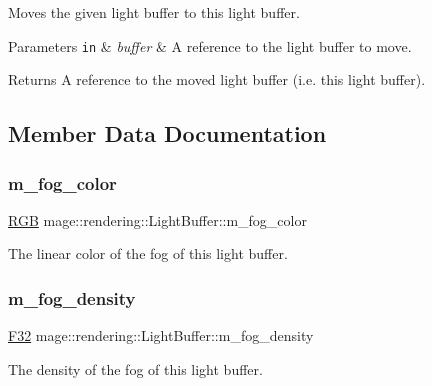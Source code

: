 Moves the given light buffer to this light buffer.


\begin{DoxyParams}[1]{Parameters}
\mbox{\tt in}  & {\em buffer} & A reference to the light buffer to move. \\
\hline
\end{DoxyParams}
\begin{DoxyReturn}{Returns}
A reference to the moved light buffer (i.\+e. this light buffer). 
\end{DoxyReturn}


\subsection{Member Data Documentation}
\hypertarget{structmage_1_1rendering_1_1_light_buffer_afe8a6982304bb5b6ee89f533798c569d}{}\label{structmage_1_1rendering_1_1_light_buffer_afe8a6982304bb5b6ee89f533798c569d} 
\subsubsection{\texorpdfstring{m\+\_\+fog\+\_\+color}{m\_fog\_color}}
{\footnotesize\ttfamily \hyperlink{structmage_1_1_r_g_b}{R\+GB} mage\+::rendering\+::\+Light\+Buffer\+::m\+\_\+fog\+\_\+color}

The linear color of the fog of this light buffer. \hypertarget{structmage_1_1rendering_1_1_light_buffer_a86ac0793a90e798c38e48d509f31aaed}{}\label{structmage_1_1rendering_1_1_light_buffer_a86ac0793a90e798c38e48d509f31aaed} 
\subsubsection{\texorpdfstring{m\+\_\+fog\+\_\+density}{m\_fog\_density}}
{\footnotesize\ttfamily \hyperlink{namespacemage_aa97e833b45f06d60a0a9c4fc22ae02c0}{F32} mage\+::rendering\+::\+Light\+Buffer\+::m\+\_\+fog\+\_\+density}

The density of the fog of this light buffer. \hypertarget{structmage_1_1rendering_1_1_light_buffer_a98c6472d82af27de8b7584ff1c7f98db}{}\label{structmage_1_1rendering_1_1_light_buffer_a98c6472d82af27de8b7584ff1c7f98db} 
